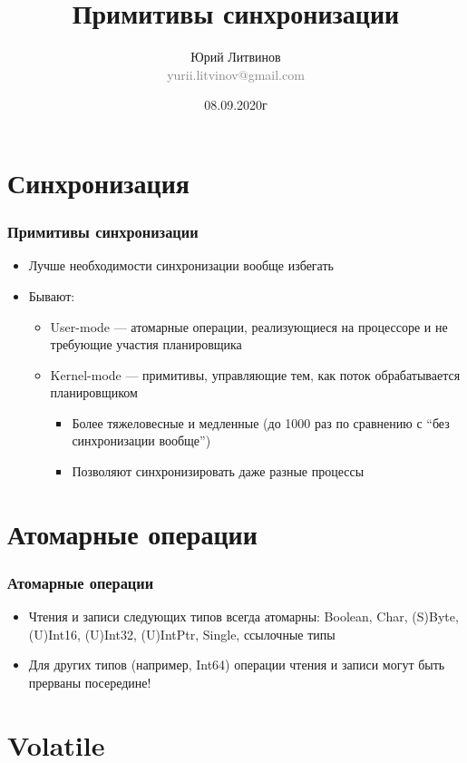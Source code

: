 \documentclass[xetex,mathserif,serif]{beamer}
\title{Примитивы синхронизации}
\author[Юрий Литвинов]{Юрий Литвинов\\\small{\textcolor{gray}{yurii.litvinov@gmail.com}}}
\date{08.09.2020г}
\begin{document}
    \frame{\titlepage}

    \section{Синхронизация}

    \begin{frame}
        \frametitle{Примитивы синхронизации}
        \begin{itemize}
            \item Лучше необходимости синхронизации вообще избегать
            \item Бывают:
            \begin{itemize}
                \item User-mode --- атомарные операции, реализующиеся на процессоре и не требующие участия планировщика
                \item Kernel-mode --- примитивы, управляющие тем, как поток обрабатывается планировщиком
                \begin{itemize}
                    \item Более тяжеловесные и медленные (до 1000 раз по сравнению с ``без синхронизации вообще'')
                    \item Позволяют синхронизировать даже разные процессы
                \end{itemize}
            \end{itemize}
        \end{itemize}
    \end{frame}

    \section{Атомарные операции}

    \begin{frame}
        \frametitle{Атомарные операции}
        \begin{itemize}
            \item Чтения и записи следующих типов всегда атомарны: Boolean, Char, (S)Byte, (U)Int16, (U)Int32, (U)IntPtr, Single, ссылочные типы
            \item Для других типов (например, Int64) операции чтения и записи могут быть прерваны посередине!
        \end{itemize}
    \end{frame}

    \section{Volatile}
\end{document}

